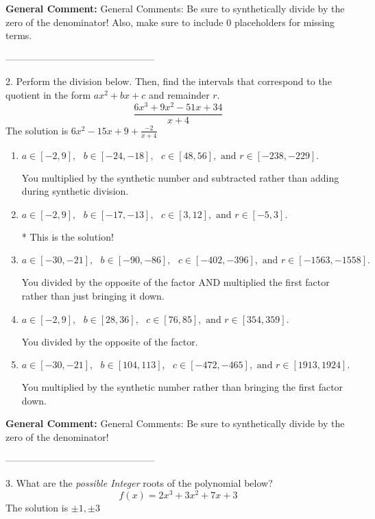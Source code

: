 \documentclass{extbook}[14pt]
\begin{document}
\textbf{General Comment:} General Comments: Be sure to synthetically divide by the zero of the denominator! Also, make sure to include 0 placeholders for missing terms. 

-----------------------------------------------

2. Perform the division below. Then, find the intervals that correspond to the quotient in the form $ax^2+bx+c$ and remainder $r$.
\[ \frac{6x^{3} +9 x^{2} -51 x + 34}{x + 4} \] 
The solution is $ 6x^{2} -15 x + 9 + \frac{-2}{x + 4} $ 

\begin{enumerate}[label=\Alph*.] 
\item $ a \in [-2, 9], \text{   } b \in [-24, -18], \text{   } c \in [48, 56], \text{   and   } r \in [-238, -229]. $ 

  You multiplied by the synthetic number and subtracted rather than adding during synthetic division. 
\item $ a \in [-2, 9], \text{   } b \in [-17, -13], \text{   } c \in [3, 12], \text{   and   } r \in [-5, 3]. $ 

 * This is the solution! 
\item $ a \in [-30, -21], \text{   } b \in [-90, -86], \text{   } c \in [-402, -396], \text{   and   } r \in [-1563, -1558]. $ 

  You divided by the opposite of the factor AND multiplied the first factor rather than just bringing it down. 
\item $ a \in [-2, 9], \text{   } b \in [28, 36], \text{   } c \in [76, 85], \text{   and   } r \in [354, 359]. $ 

  You divided by the opposite of the factor. 
\item $ a \in [-30, -21], \text{   } b \in [104, 113], \text{   } c \in [-472, -465], \text{   and   } r \in [1913, 1924]. $ 

  You multiplied by the synthetic number rather than bringing the first factor down. 
\end{enumerate} 
 
\textbf{General Comment:} General Comments: Be sure to synthetically divide by the zero of the denominator! 

-----------------------------------------------

3. What are the \textit{possible Integer} roots of the polynomial below?
\[ f(x) = 2x^{3} +3 x^{2} +7 x + 3 \] 
The solution is $ \pm 1,\pm 3 $ 
\end{document}
